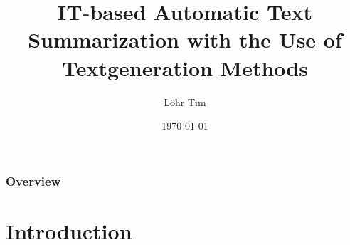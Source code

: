 \documentclass{beamer}
\title[Department of Computer Science]{IT-based Automatic Text Summarization with the Use of Textgeneration Methods} %
\author{L\"ohr Tim}
\institute[Prof. Dr. Alfred Holl] %
{
Technische Hochschule Nürnberg Georg Simon OHM\\ %
\medskip
\textit{Bachelor Thesis | Business Information Systems and Management} 
}
\date{\today} %
\begin{document}
\begin{frame}
\titlepage %
\end{frame}
\begin{frame}
\frametitle{Overview} %
\tableofcontents %
\end{frame}
%

\section{Introduction}

\end{document}

